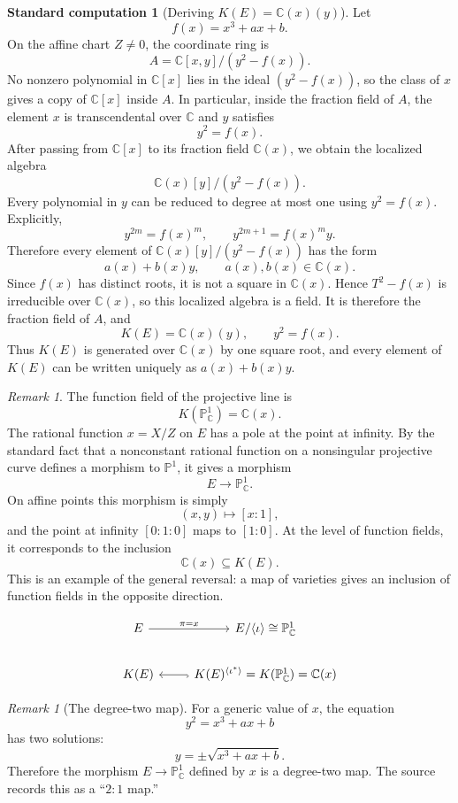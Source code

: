 \documentclass[11pt]{article}
\theoremstyle{definition}
\newtheorem{calculation}[theorem]{Standard computation}
\theoremstyle{remark}
\newtheorem{remark}[theorem]{Remark}
\newcommand{\C}{\mathbb{C}}
\newcommand{\Pj}{\mathbb{P}}
\newcommand{\K}{K}
\begin{document}
\begin{calculation}[Deriving \(\K(E)=\C(x)(y)\)]
Let
\[
  f(x)=x^3+ax+b.
\]
On the affine chart \(Z\neq 0\), the coordinate ring is
\[
  A=\C[x,y]/(y^2-f(x)).
\]
No nonzero polynomial in \(\C[x]\) lies in the ideal \((y^2-f(x))\), so the
class of \(x\) gives a copy of \(\C[x]\) inside \(A\).  In particular, inside
the fraction field of \(A\), the element \(x\) is transcendental over \(\C\)
and \(y\) satisfies
\[
  y^2=f(x).
\]
After passing from \(\C[x]\) to its fraction field \(\C(x)\), we obtain the
localized algebra
\[
  \C(x)[y]/(y^2-f(x)).
\]
Every polynomial in \(y\) can be reduced to degree at most one using
\(y^2=f(x)\).  Explicitly,
\[
  y^{2m}=f(x)^m,
  \qquad
  y^{2m+1}=f(x)^m y.
\]
Therefore every element of \(\C(x)[y]/(y^2-f(x))\) has the form
\[
  a(x)+b(x)y,
  \qquad a(x),b(x)\in \C(x).
\]
Since \(f(x)\) has distinct roots, it is not a square in \(\C(x)\).  Hence
\(T^2-f(x)\) is irreducible over \(\C(x)\), so this localized algebra is a
field.  It is therefore the fraction field of \(A\), and
\[
  \K(E)=\C(x)(y),
  \qquad y^2=f(x).
\]
Thus \(\K(E)\) is generated over \(\C(x)\) by one square root, and every
element of \(\K(E)\) can be written uniquely as \(a(x)+b(x)y\).
\end{calculation}

\begin{remark}
The function field of the projective line is
\[
  \K(\Pj^1_{\C})=\C(x).
\]
The rational function \(x=X/Z\) on \(E\) has a pole at the point at infinity.
By the standard fact that a nonconstant rational function on a nonsingular
projective curve defines a morphism to \(\Pj^1\), it gives a morphism
\[
  E\longrightarrow \Pj^1_{\C}.
\]
On affine points this morphism is simply
\[
  (x,y)\longmapsto [x:1],
\]
and the point at infinity \([0:1:0]\) maps to \([1:0]\).
At the level of function fields, it corresponds to the inclusion
\[
  \C(x)\subseteq \K(E).
\]
This is an example of the general reversal: a map of varieties gives an
inclusion of function fields in the opposite direction.
\end{remark}

\[
\begin{tikzcd}
  E \arrow[r, "\pi=x"] & E/\langle\iota\rangle \cong \Pj^1_{\C}\\
  \K(E) & \K(E)^{\langle\iota^*\rangle}=\K(\Pj^1_{\C})=\C(x) \arrow[l, hook]
\end{tikzcd}
\]

\begin{remark}[The degree-two map]
For a generic value of \(x\), the equation
\[
  y^2=x^3+ax+b
\]
has two solutions:
\[
  y=\pm\sqrt{x^3+ax+b}.
\]
Therefore the morphism \(E\to \Pj^1_{\C}\) defined by \(x\) is a degree-two
map.  The source records this as a ``\(2:1\) map.''
\end{remark}
\end{document}
